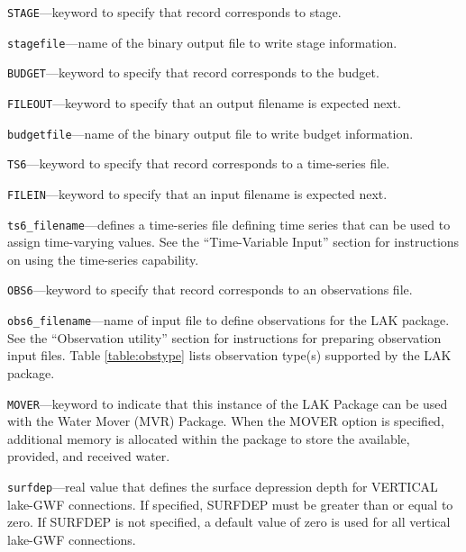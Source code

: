 \begin{description}
\item \texttt{STAGE}---keyword to specify that record corresponds to stage.

\item \texttt{stagefile}---name of the binary output file to write stage information.

\item \texttt{BUDGET}---keyword to specify that record corresponds to the budget.

\item \texttt{FILEOUT}---keyword to specify that an output filename is expected next.

\item \texttt{budgetfile}---name of the binary output file to write budget information.

\item \texttt{TS6}---keyword to specify that record corresponds to a time-series file.

\item \texttt{FILEIN}---keyword to specify that an input filename is expected next.

\item \texttt{ts6\_filename}---defines a time-series file defining time series that can be used to assign time-varying values. See the ``Time-Variable Input'' section for instructions on using the time-series capability.

\item \texttt{OBS6}---keyword to specify that record corresponds to an observations file.

\item \texttt{obs6\_filename}---name of input file to define observations for the LAK package. See the ``Observation utility'' section for instructions for preparing observation input files. Table \ref{table:obstype} lists observation type(s) supported by the LAK package.

\item \texttt{MOVER}---keyword to indicate that this instance of the LAK Package can be used with the Water Mover (MVR) Package.  When the MOVER option is specified, additional memory is allocated within the package to store the available, provided, and received water.

\item \texttt{surfdep}---real value that defines the surface depression depth for VERTICAL lake-GWF connections. If specified, SURFDEP must be greater than or equal to zero. If SURFDEP is not specified, a default value of zero is used for all vertical lake-GWF connections.


\end{description}
